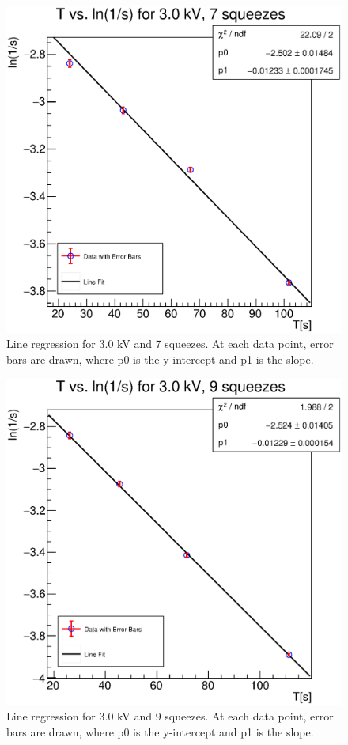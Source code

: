 \documentclass[reprint,amsmath,aps,nofootinbib,english]{revtex4-2}
\begin{document}
\begin{figure}[H]
  \includegraphics[width=0.95\columnwidth]{graphics/30_7.eps}
  \caption{Line regression for 3.0 kV and 7 squeezes. At each data point, error bars are drawn, where p0 is the y-intercept and p1 is the slope.}
\end{figure}




\begin{figure}[H]
  \includegraphics[width=0.95\columnwidth]{graphics/30_9.eps}
  \caption{Line regression for 3.0 kV and 9 squeezes. At each data point, error bars are drawn, where p0 is the y-intercept and p1 is the slope.}
\end{figure}
\end{document}
